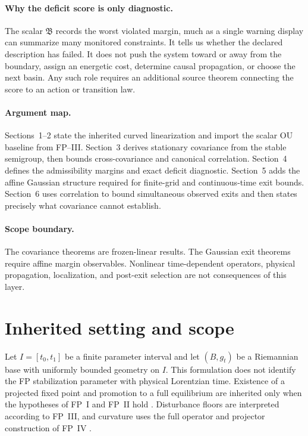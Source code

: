 \documentclass[11pt]{article}
\begin{document}
\paragraph{Why the deficit score is only diagnostic.}
The scalar $\mathfrak B$ records the worst violated margin, much as a single
warning display can summarize many monitored constraints.  It tells us
whether the declared description has failed.  It does not push the system
toward or away from the boundary, assign an energetic cost, determine causal
propagation, or choose the next basin.  Any such role requires an additional
source theorem connecting the score to an action or transition law.

\paragraph{Argument map.}
Sections~1--2 state the inherited curved linearization and import the scalar
OU baseline from FP--III.  Section~3 derives stationary covariance from the
stable semigroup, then bounds cross-covariance and canonical correlation.
Section~4 defines the admissibility margins and exact deficit diagnostic.
Section~5 adds the affine Gaussian structure required for finite-grid and
continuous-time exit bounds.  Section~6 uses correlation to bound
simultaneous observed exits and then states precisely what covariance cannot
establish.

\paragraph{Scope boundary.}
The covariance theorems are frozen-linear results.  The Gaussian exit
theorems require affine margin observables.  Nonlinear time-dependent
operators, physical propagation, localization, and post-exit selection are
not consequences of this layer.

\tableofcontents

\section{Inherited setting and scope}

Let $I=[t_0,t_1]$ be a finite parameter interval and let $(B,g_t)$ be a
Riemannian base with uniformly bounded geometry on $I$. This formulation does
not identify the FP stabilization parameter with physical Lorentzian time.
Existence of a projected fixed point and promotion to a full equilibrium are
inherited only when the hypotheses of FP~I and FP~II hold \cite{FPI,FPII}. Disturbance floors
are interpreted according to FP~III, and curvature uses the full operator and
projector construction of FP~IV \cite{FPIV}.
\end{document}
